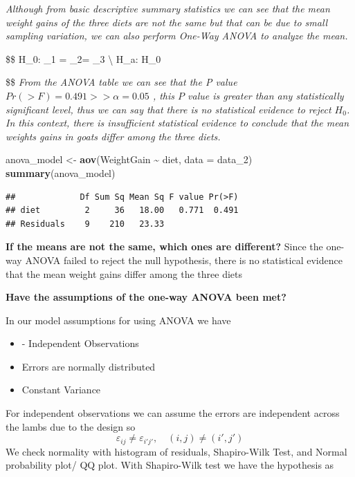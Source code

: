 \documentclass[
]{article}
\newenvironment{Shaded}{\begin{snugshade}}{\end{snugshade}}
\newcommand{\AttributeTok}[1]{\textcolor[rgb]{0.13,0.29,0.53}{#1}}
\newcommand{\FunctionTok}[1]{\textcolor[rgb]{0.13,0.29,0.53}{\textbf{#1}}}
\newcommand{\NormalTok}[1]{#1}
\newcommand{\OtherTok}[1]{\textcolor[rgb]{0.56,0.35,0.01}{#1}}
\newcommand{\SpecialCharTok}[1]{\textcolor[rgb]{0.81,0.36,0.00}{\textbf{#1}}}
\begin{document}
\textit{Although from basic descriptive summary statistics we can see that the mean weight gains of the three diets are not the same but that can be due to small sampling variation, we can also perform One-Way ANOVA to analyze the mean.}

\$\$ H\_0: \mu\_1 = \mu\_2= \mu\_3 \textbackslash{} H\_a: H\_0

\$\$
\textit{From the ANOVA table we can see that the P value $Pr(>F) = 0.491 >> \alpha = 0.05$ , this $P$ value is greater than any statistically significant level, thus we can say that there is no statistical evidence to reject $H_0$. In this context, there is insufficient statistical evidence to conclude that the mean weights gains in goats differ among the three diets.}

\begin{Shaded}
\begin{Highlighting}[]
\NormalTok{anova\_model }\OtherTok{\textless{}{-}} \FunctionTok{aov}\NormalTok{(WeightGain }\SpecialCharTok{\textasciitilde{}}\NormalTok{ diet, }\AttributeTok{data =}\NormalTok{ data\_2)}
\FunctionTok{summary}\NormalTok{(anova\_model)}
\end{Highlighting}
\end{Shaded}

\begin{verbatim}
##             Df Sum Sq Mean Sq F value Pr(>F)
## diet         2     36   18.00   0.771  0.491
## Residuals    9    210   23.33
\end{verbatim}

\textbf{If the means are not the same, which ones are different?} Since
the one-way ANOVA failed to reject the null hypothesis, there is no
statistical evidence that the mean weight gains differ among the three
diets

\textbf{Have the assumptions of the one-way ANOVA been met?}

In our model assumptions for using ANOVA we have

\begin{itemize}
\item - Independent Observations 
\item Errors are normally distributed 
\item Constant Variance 
\end{itemize}

For independent observations we can assume the errors are independent
across the lambs due to the design so
\[ \varepsilon_{ij} \neq \varepsilon_{i'j'}, \quad (i , j) \neq (i' ,j') \]
We check normality with histogram of residuals, Shapiro-Wilk Test, and
Normal probability plot/ QQ plot. With Shapiro-Wilk test we have the
hypothesis as
\end{document}
